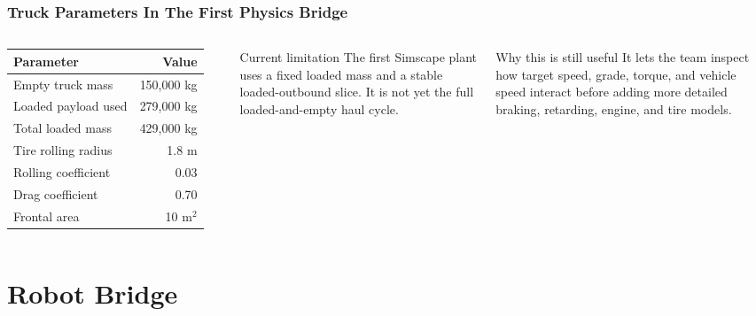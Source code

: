 \documentclass[aspectratio=169]{beamer}
\begin{document}
\begin{frame}
\frametitle{Truck Parameters In The First Physics Bridge}

\begin{columns}[T,totalwidth=\textwidth]
\centering
\scriptsize
\begin{tabular}{lr}
\toprule
Parameter & Value \\
\midrule
Empty truck mass & 150,000 kg \\
Loaded payload used & 279,000 kg \\
Total loaded mass & 429,000 kg \\
Tire rolling radius & 1.8 m \\
Rolling coefficient & 0.03 \\
Drag coefficient & 0.70 \\
Frontal area & 10 m$^2$ \\
\bottomrule
\end{tabular}

\begin{alertblock}{Current limitation}
\small
The first Simscape plant uses a fixed loaded mass and a stable loaded-outbound slice. It is not yet the full loaded-and-empty haul cycle.
\end{alertblock}

\vspace{0.25cm}
\begin{block}{Why this is still useful}
\small
It lets the team inspect how target speed, grade, torque, and vehicle speed interact before adding more detailed braking, retarding, engine, and tire models.
\end{block}
\end{columns}

\end{frame}

\section{Robot Bridge}
\end{document}

